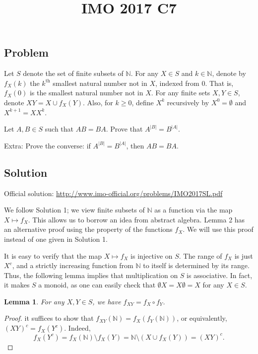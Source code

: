 \documentclass{article}
\title{IMO 2017 C7}
\author{}
\date{}
\newcommand{\N}{\mathbb{N}}
\newtheorem{lemma}{Lemma}
\begin{document}
\maketitle



\subsection*{Problem}

Let $S$ denote the set of finite subsets of $\N$.
For any $X \in S$ and $k \in \N$, denote by $f_X(k)$ the $k^{\text{th}}$ smallest natural number not in $X$, indexed from $0$.
That is, $f_X(0)$ is the smallest natural number not in $X$.
For any finite sets $X, Y \in S$, denote $XY = X \cup f_X(Y)$.
Also, for $k \geq 0$, define $X^k$ recursively by $X^0 = \emptyset$ and $X^{k + 1} = XX^k$.

Let $A, B \in S$ such that $AB = BA$.
Prove that $A^{|B|} = B^{|A|}$.

Extra: Prove the converse: if $A^{|B|} = B^{|A|}$, then $AB = BA$.



\subsection*{Solution}

Official solution: \url{http://www.imo-official.org/problems/IMO2017SL.pdf}

We follow Solution 1; we view finite subsets of $\N$ as a function via the map $X \mapsto f_X$.
This allows us to borrow an idea from abstract algebra.
Lemma 2 has an alternative proof using the property of the functions $f_X$.
We will use this proof instead of one given in Solution 1.

It is easy to verify that the map $X \mapsto f_X$ is injective on $S$.
The range of $f_X$ is just $X^c$, and a strictly increasing function from $\N$ to itself is determined by its range.
Thus, the following lemma implies that multiplication on $S$ is associative.
In fact, it makes $S$ a monoid, as one can easily check that $\emptyset X = X \emptyset = X$ for any $X \in S$.

\begin{lemma}\label{2017c7-1}
For any $X, Y \in S$, we have $f_{XY} = f_X \circ f_Y$.
\end{lemma}
\begin{proof}
it suffices to show that $f_{XY}(\N) = f_X(f_Y(\N))$, or equivalently, $(XY)^c = f_X(Y^c)$.
Indeed,
\[ f_X(Y^c) = f_X(\N) \setminus f_X(Y) = \N \setminus (X \cup f_X(Y)) = (XY)^c. \]
\end{proof}
\end{document}
